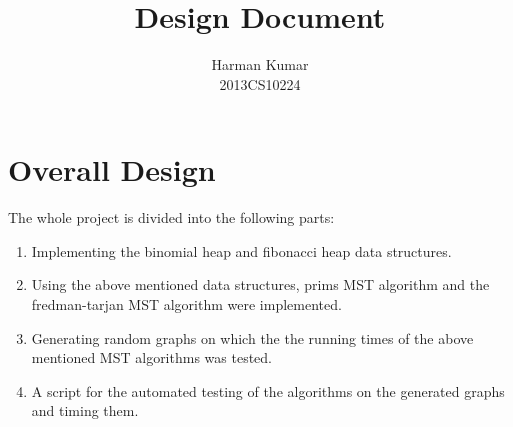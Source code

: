 \documentclass[]{article}
\begin{document}
\author{
		Harman Kumar\\
		2013CS10224		
		}

\title{Design Document}
\maketitle







\section{Overall Design}

\begin{flushleft}
The whole project is divided into the following parts:

\begin{enumerate}

\item Implementing the binomial heap and fibonacci heap data structures.

\item Using the above mentioned data structures, prims MST algorithm and the fredman-tarjan MST algorithm were implemented.

\item Generating random graphs on which the the running times of the above mentioned MST algorithms was tested. 

\item A script for the automated testing of the algorithms on the generated graphs and timing them.  

\end{enumerate} 

\end{flushleft} 
\end{document}
